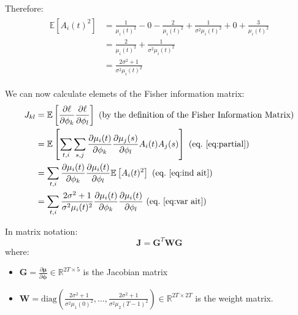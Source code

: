 Therefore:
\begin{align}\label{eq:var ait}
  \begin{split}
    \mathbb{E}[A_i(t)^2] &= \frac{1}{\mu_i(t)^2} - 0 - \frac{2}{\mu_i(t)^2} +
    \frac{1}{\sigma^2\mu_i(t)^2} +0 + \frac{3}{\mu_i(t)^2} \\
    &= \frac{2}{\mu_i(t)^2} + \frac{1}{\sigma^2\mu_i(t)^2} \\
    &= \frac{2\sigma^2 + 1}{\sigma^2\mu_i(t)^2}
  \end{split}
\end{align}



We can now calculate elemets of the Fisher information matrix:
\begin{align}
  \begin{split}
  J_{kl} &= \mathbb{E}\left[\frac{\partial \ell}{\partial \phi_k}
    \frac{\partial \ell}{\partial \phi_l}\right] \text{ (by the definition of
    the Fisher Information Matrix)}\\
  &= \mathbb{E} \left [\sum_{t,i} \sum_{s,j} \frac{\partial
      \mu_i(t)}{\partial \phi_k} \frac{\partial \mu_j(s)}{\partial
      \phi_l} A_i(t) A_j(s) \right ] \text{ (eq.~\eqref{eq:partial})} \\
  &= \sum_{t,i} \frac{\partial \mu_i(t)}{\partial
    \phi_k}\frac{\partial \mu_i(t)}{\partial \phi_l} \mathbb{E} \left
  [A_i(t)^2 \right ] \text{ (eq.~\eqref{eq:ind ait})}\\
  &= \sum_{t,i} \frac{2\sigma^2+1}{\sigma^2\mu_i(t)^2}\frac{\partial \mu_i(t)}{\partial
    \phi_k}\frac{\partial \mu_i(t)}{\partial \phi_l}  \text{ (eq.~\eqref{eq:var ait})}\\
  \end{split}
\end{align}


In matrix notation:
\begin{equation*}
\mathbf{J} = \mathbf{G}^T \mathbf{W} \mathbf{G}
\end{equation*}
where:
\begin{itemize}
\item $\mathbf{G} = \frac{\partial \boldsymbol{\mu}}{\partial \boldsymbol{\phi}} \in \mathbb{R}^{2T \times 5}$ is the Jacobian matrix
\item $\mathbf{W} = \text{diag}(\frac{2\sigma^2 + 1}{\sigma^2\mu_1(0)^2}, \ldots, \frac{2\sigma^2 + 1}{\sigma^2\mu_2(T-1)^2}) \in \mathbb{R}^{2T \times 2T}$ is the weight matrix.
\end{itemize}
